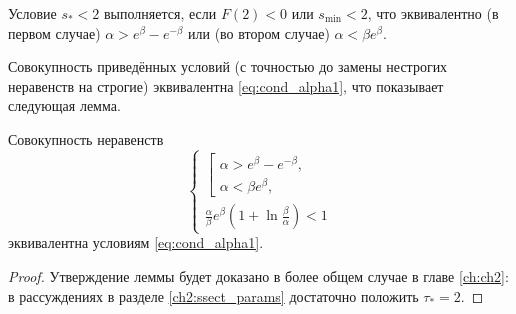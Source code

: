 
Условие $s_* < 2$ выполняется, если $F(2) < 0$ или $s_{\min} < 2$, что эквивалентно (в первом случае) $\alpha > e^{\beta} - e^{-\beta}$ или (во втором случае) $\alpha < \beta e^{\beta}$.

Совокупность приведённых условий (с точностью до замены нестрогих неравенств на строгие) эквивалентна \eqref{eq:cond_alpha1}, что показывает следующая лемма.

\begin{lemma}
\label{lm:parameter_constraints:ch1}
Совокупность неравенств 
\[
\begin{cases}
\left[
\begin{array}{ll}
	\alpha > e^{\beta} - e^{-\beta},\\
    \alpha < \beta e^{\beta},
\end{array}
\right.\\
\frac{\alpha}{\beta}e^{\beta}\left(1 + \ln\frac{\beta}{\alpha}\right) < 1
\end{cases}
\]
эквивалентна условиям \eqref{eq:cond_alpha1}.
\end{lemma}
\begin{proof}
	Утверждение леммы будет доказано в более общем случае в главе \ref{ch:ch2}: в рассуждениях в разделе \ref{ch2:ssect_params} достаточно положить $\tau_* = 2$.
\end{proof}

